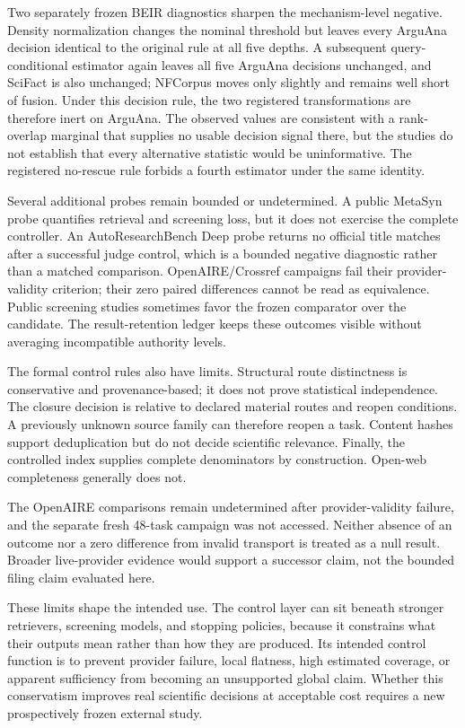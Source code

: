 \documentclass[a4paper,fleqn]{cas-sc}
\theoremstyle{definition}
\begin{document}
Two separately frozen BEIR diagnostics sharpen the mechanism-level negative.
Density normalization changes the nominal threshold but leaves every ArguAna
decision identical to the original rule at all five depths. A subsequent
query-conditional estimator again leaves all five ArguAna decisions unchanged,
and SciFact is also unchanged; NFCorpus moves only slightly and remains well
short of fusion. Under this decision rule, the two registered transformations
are therefore inert on ArguAna. The observed values are consistent with a
rank-overlap marginal that supplies no usable decision signal there, but the
studies do not establish that every alternative statistic would be
uninformative. The registered no-rescue rule forbids a fourth estimator under
the same identity.

Several additional probes remain bounded or undetermined. A public MetaSyn
probe quantifies retrieval and screening loss, but it does not exercise the
complete controller. An AutoResearchBench Deep probe returns no official title
matches after a successful judge control, which is a bounded negative
diagnostic rather than a matched comparison. OpenAIRE/Crossref campaigns fail
their provider-validity criterion; their zero paired differences cannot be read
as equivalence. Public screening studies sometimes favor the frozen comparator over
the candidate. The result-retention ledger keeps these outcomes visible without
averaging incompatible authority levels.

The formal control rules also have limits. Structural route distinctness is
conservative and provenance-based; it does not prove statistical independence. The closure
decision is relative to declared material routes and reopen conditions. A
previously unknown source family can therefore reopen a task. Content hashes
support deduplication but do not decide scientific relevance. Finally, the
controlled index supplies complete denominators by construction. Open-web
completeness generally does not.

The OpenAIRE comparisons remain undetermined after provider-validity failure,
and the separate fresh 48-task campaign was not accessed. Neither absence of an
outcome nor a zero difference from invalid transport is treated as a null
result. Broader live-provider evidence would support a successor claim, not the
bounded filing claim evaluated here.

These limits shape the intended use. The control layer can sit beneath stronger
retrievers, screening models, and stopping policies, because it constrains what
their outputs mean rather than how they are produced. Its intended control function is to
prevent provider failure, local flatness, high estimated coverage, or apparent
sufficiency from becoming an unsupported global claim. Whether this
conservatism improves real scientific decisions at acceptable cost requires a
new prospectively frozen external study.
\end{document}
